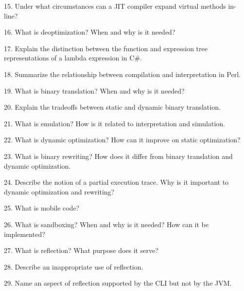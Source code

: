 15. Under what circumstances can a JIT compiler expand virtual methods in-line?

\filbreak
\vskip 1cm

16. What is deoptimization? When and why is it needed?

\filbreak
\vskip 1cm

17. Explain the distinction between the function and expression tree representations of a lambda expression in C$\#$.

\filbreak
\vskip 1cm

18. Summarize the relationship between compilation and interpretation in Perl.

\filbreak
\vskip 1cm

19. What is binary translation? When and why is it needed?

\filbreak
\vskip 1cm

20. Explain the tradeoffs between static and dynamic binary translation.


\filbreak
\vskip 1cm

21. What is emulation? How is it related to interpretation and simulation.

\filbreak
\vskip 1cm

22. What is dynamic optimization? How can it improve on static optimization?

\filbreak
\vskip 1cm

23. What is binary rewriting? How does it differ from binary translation and dynamic optimization.

\filbreak
\vskip 1cm

24. Describe the notion of a partial execution trace. Why is it important to dynamic optimization and rewriting?

\filbreak
\vskip 1cm

25. What is mobile code?

\filbreak
\vskip 1cm

26. What is sandboxing? When and why is it needed? How can it be implemented?

\filbreak
\vskip 1cm

27. What is reflection? What purpose does it serve?

\filbreak
\vskip 1cm

28. Describe an inappropriate use of reflection.

\filbreak
\vskip 1cm

29. Name an aspect of reflection supported by the CLI but not by the JVM.

\filbreak
\vskip 1cm


